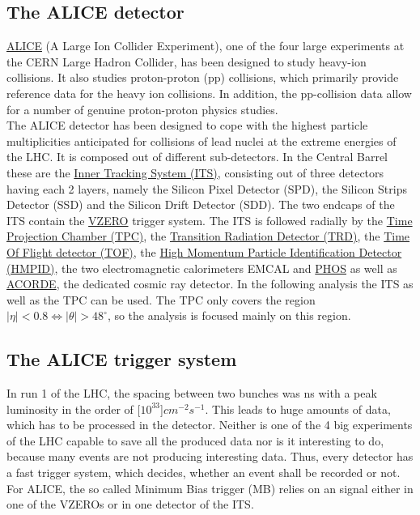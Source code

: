 \documentclass{article}
\begin{document}
\subsection{The ALICE detector}
\href{http://aliceinfo.cern.ch/}{ALICE} (A Large Ion Collider Experiment), one of the four large experiments at the CERN Large Hadron Collider, has been designed to study heavy-ion collisions. It also studies proton-proton (pp) collisions, which primarily provide reference data for the heavy ion collisions. In addition, the pp-collision data allow for a number of genuine proton-proton physics studies.\\
The ALICE detector has been designed to cope with the highest particle multiplicities anticipated for collisions of lead nuclei at the extreme energies of the LHC. It is composed out of different sub-detectors. In the Central Barrel these are 
the \href{http://alipub.web.cern.ch/content/inner-tracking-system}{Inner Tracking System (ITS)}, consisting out of three detectors having each 2 layers, namely the Silicon Pixel Detector (SPD), the Silicon Strips Detector (SSD) and the Silicon Drift Detector (SDD). The two endcaps of the ITS contain 
the \href{http://alipub.web.cern.ch/content/v0-detector}{VZERO} trigger system. The ITS is followed radially by
the \href{http://alipub.web.cern.ch/content/time-projection-chamber}{Time Projection Chamber (TPC)}, 
the \href{http://alipub.web.cern.ch/content/transition-radiation-detector}{Transition Radiation Detector (TRD)}, 
the \href{http://alipub.web.cern.ch/content/time-flight}{Time Of Flight detector (TOF)}, 
the \href{http://alipub.web.cern.ch/content/high-momentum-particle-identification-detector}{High Momentum Particle Identification Detector (HMPID)}, the two electromagnetic calorimeters 
EMCAL and 
\href{http://alipub.web.cern.ch/content/photon-spectrometer}{PHOS} as well as 
\href{http://alipub.web.cern.ch/content/alice-cosmic-ray-detector}{ACORDE}, the dedicated cosmic ray detector. In the following analysis the ITS as well as the TPC can be used. The TPC only covers the region $|\eta|<0.8 \Leftrightarrow |\theta|>48^{\circ}$, so the analysis is focused mainly on this region.

\subsection{The ALICE trigger system}
In run 1 of the LHC, the spacing between two bunches was \unit[50]{ns} with a peak luminosity in the order of \unit[$10^{33}$]{$cm^{-2} s^{-1}$}. This leads to huge amounts of data, which has to be processed in the detector. Neither is one of the 4 big experiments of the LHC capable to save all the produced data nor is it interesting to do, because many events are not producing interesting data. Thus, every detector has a fast trigger system, which decides, whether an event shall be recorded or not. For ALICE, the so called Minimum Bias trigger (MB) relies on an signal either in one of the VZEROs or in one detector of the ITS. 
\end{document}

